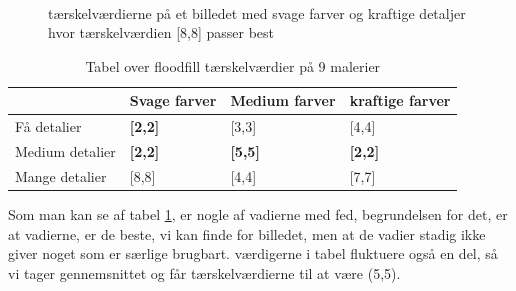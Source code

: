 \begin{figure}[!h]
    \centering
    \\
    \caption[]{tærskelværdierne på et billedet med svage farver og kraftige detaljer hvor tærskelværdien [8,8] passer best}
    \label{Floodfillbilledet}
\end{figure}

\begin{table}[!h]
    \centering
    \begin{tabular}{| l | l | l | l |} \hline
        & Svage farver 		& Medium farver & kraftige farver \\ \hline
        Få detalier 		& \textbf{[2,2]}	& [3,3]			& [4,4]\\ \hline
        Medium detalier 	& \textbf{[2,2]}	& \textbf{[5,5]}& \textbf{[2,2]}\\ \hline
        Mange detalier		& [8,8]				& [4,4]			& [7,7]\\ \hline
    \end{tabular}
    \caption{Tabel over floodfill tærskelværdier på 9 malerier}
    \label{thressholdsTabelFF}
\end{table}

Som man kan se af tabel \ref{thressholdsTabelFF}, er nogle af vadierne
med fed, begrundelsen for det, er at vadierne, er de beste, vi kan finde
for billedet, men at de vadier stadig ikke giver noget som er særlige
brugbart. værdigerne i tabel fluktuere også en del, så vi tager
gennemsnittet og får tærskelværdierne til at være (5,5).
